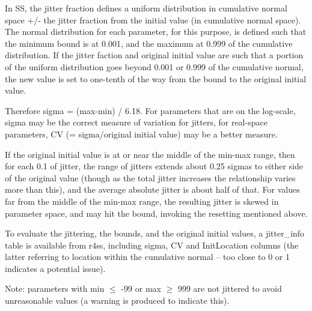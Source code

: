 In SS, the jitter fraction defines a uniform distribution in cumulative normal space +/- the jitter fraction from the initial value (in cumulative normal space). The normal distribution for each parameter, for this purpose, is defined such that the minimum bound is at 0.001, and the maximum at 0.999 of the cumulative distribution. If the jitter faction and original initial value are such that a portion of the uniform distribution goes beyond 0.001 or 0.999 of the cumulative normal, the new value is set to one-tenth of the way from the bound to the original initial value. 

Therefore sigma = (max-min) / 6.18. For parameters that are on the log-scale, sigma may be the correct measure of variation for jitters, for real-space parameters, CV (= sigma/original initial value) may be a better measure. 

If the original initial value is at or near the middle of the min-max range, then for each 0.1 of jitter, the range of jitters extends about 0.25 sigmas to either side of the original value (though as the total jitter increases the relationship varies more than this), and the average absolute jitter is about half of that.  For values far from the middle of the min-max range, the resulting jitter is skewed in parameter space, and may hit the bound, invoking the resetting mentioned above. 

To evaluate the jittering, the bounds, and the original initial values, a jitter\_info table is available from r4ss, including sigma, CV and InitLocation columns (the latter referring to location within the cumulative normal – too close to 0 or 1 indicates a potential issue).

Note: parameters with min $\leq$ -99 or max $\geq$ 999 are not jittered to avoid unreasonable values (a warning is produced to indicate this).

\hypertarget{PriorDescrip}{}
